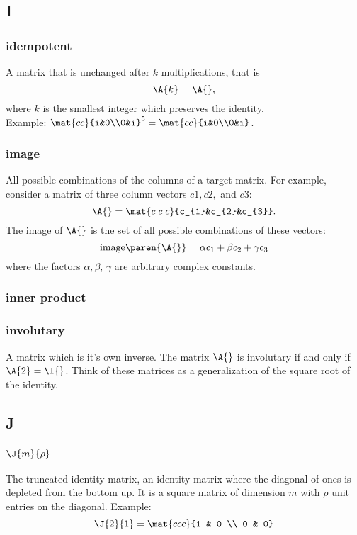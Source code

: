 \subsection*{I} 

\subsubsection*{idempotent}
A matrix that is unchanged after $k$ multiplications, that is
$$
\A{k} = \A{},
$$
where $k$ is the smallest integer which preserves the identity.\\

Example: $\mat{cc}{i&0\\0&i}^5=\mat{cc}{i&0\\0&i}$.

\subsubsection*{image}
All possible combinations of the columns of a target matrix. For example, consider a matrix of three column vectors $c1, c2,$ and $c3$:
\begin{equation}
  \A{} = \mat{c|c|c}{c_{1}&c_{2}&c_{3}}.
\end{equation}
The image of $\A{}$ is the set of all possible combinations of these vectors:
\begin{equation}
  \text{image}\paren{\A{}} = \alpha c_{1} + \beta c_{2} + \gamma c_{3}
\end{equation}
where the factors $\alpha, \beta$, $\gamma$ are arbitrary complex constants.

\subsubsection*{inner product}

\subsubsection*{involutary}
A matrix which is it's own inverse. The matrix $\A{}$ is involutary if and only if $\A{2} = \I{}$. Think of these matrices as a generalization of the square root of the identity.

\subsection*{J} 

\subsubsection*{$\J{m}{\rho}$}
The truncated identity matrix, an identity matrix where the diagonal of ones is depleted from the bottom up. It is a square matrix of dimension $m$ with $\rho $ unit entries on the diagonal.
Example:
$$
\J{2}{1} = \mat{ccc}{1 & 0 \\ 0 & 0}
$$

